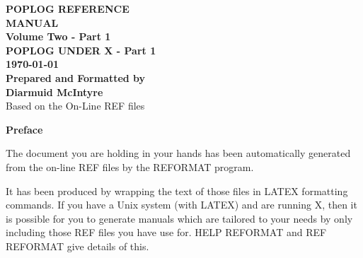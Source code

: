 


\begin{titlepage}
\begin{center}
\rule{0cm}{3cm}
{\Huge\bf POPLOG REFERENCE \\
\vspace{0.5cm}
MANUAL}\\
\vspace{3cm}
{\bf\Large
Volume Two - Part 1}\\
\vspace{1cm}
{\LARGE\bf POPLOG UNDER X - Part 1}\\
\vspace{1cm}
{\bf\Large \today }\\
\vspace{10cm}
{\LARGE\bf Prepared and Formatted by \\ Diarmuid McIntyre}\\
\vspace{1.5cm}
{\Large Based on the On-Line REF files \\}
\end{center}

\end{titlepage}


\rule{0cm}{3cm}
\begin{center}
{\Huge\bf Preface}
\end{center}
\vspace{1cm}

 The document you are holding in your hands has been automatically
generated from the on-line REF files by the REFORMAT program.

It has been produced by wrapping the text of those files in LATEX
formatting commands. If you have a Unix system (with LATEX) and are
running X, then it is possible for you to generate manuals which are
tailored to your needs by only including those REF files you have use
for. HELP REFORMAT and REF REFORMAT give details of this.


